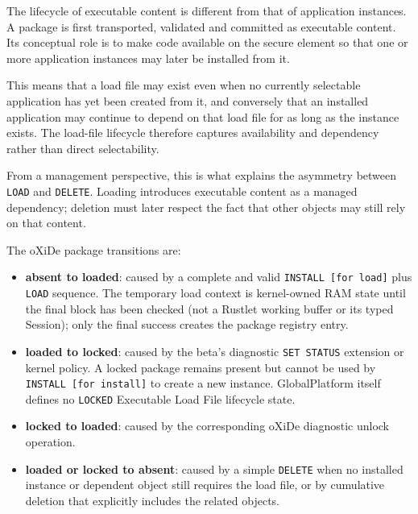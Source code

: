 
The lifecycle of executable content is different from that of application
instances. A package is first transported, validated and committed as executable
content. Its conceptual role is to make code available on the secure element so
that one or more application instances may later be installed from it.

This means that a load file may exist even when no currently selectable
application has yet been created from it, and conversely that an
installed application may continue to depend on that load file for as
long as the instance exists. The load-file lifecycle therefore captures
availability and dependency rather than direct selectability.

From a management perspective, this is what explains the asymmetry
between \texttt{LOAD} and \texttt{DELETE}. Loading introduces executable
content as a managed dependency; deletion must later respect the fact
that other objects may still rely on that content.

The oXiDe package transitions are:

\begin{itemize}
\item \textbf{absent to loaded}: caused by a complete and valid
  \texttt{INSTALL [for load]} plus \texttt{LOAD} sequence. The temporary load
  context is kernel-owned RAM state until the final block has been checked
  (not a Rustlet working buffer or its typed Session); only the final
  success creates the package registry entry.
\item \textbf{loaded to locked}: caused by the beta's diagnostic
  \texttt{SET STATUS} extension or kernel policy. A locked package remains
  present but cannot be used by \texttt{INSTALL [for install]} to create a new
  instance. GlobalPlatform itself defines no \texttt{LOCKED} Executable Load
  File lifecycle state.
\item \textbf{locked to loaded}: caused by the corresponding oXiDe diagnostic
  unlock operation.
\item \textbf{loaded or locked to absent}: caused by a simple \texttt{DELETE}
  when no installed instance or dependent object still requires the load file,
  or by cumulative deletion that explicitly includes the related objects.
\end{itemize}


